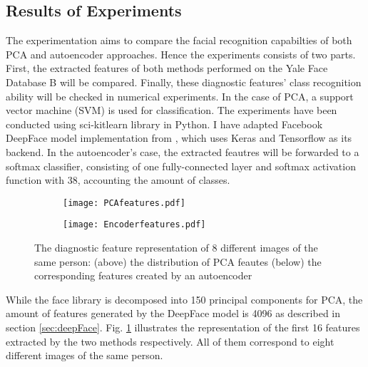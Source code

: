 \subsection{Results of Experiments}
The experimentation aims to compare the facial recognition capabilties of both
PCA and autoencoder approaches. Hence the experiments consists of two parts.
First, the extracted features of both methods performed on the Yale Face
Database B will be compared. Finally, these diagnostic features' class
recognition ability will be checked in numerical experiments. In the case of
PCA, a support vector machine (SVM) is used for classification. The experiments
have been conducted using sci-kitlearn \cite{sk} library in Python. I
have adapted Facebook DeepFace model implementation from
\cite{serengil2017tensorflow101}, which uses Keras \cite{chollet2015keras} and
Tensorflow \cite{tensorflow2015-whitepaper} as its backend. In the autoencoder's
case, the extracted feautres will be forwarded to a softmax classifier,
consisting of one fully-connected layer and softmax activation function with 38,
accounting the amount of classes.

\begin{figure}[h]
  \begin{subfigure}{}
    \texttt{[image: PCAfeatures.pdf]}
  \end{subfigure}

  \begin{subfigure}{}
    \texttt{[image: Encoderfeatures.pdf]}
  \end{subfigure}

  \caption{The diagnostic feature representation of 8 different images of the same person: (above) the distribution of PCA feautes (below) the corresponding features created by an autoencoder}
  \label{features}
\end{figure}

While the face library is decomposed into 150 principal components for PCA, the
amount of features generated by the DeepFace model is 4096 as described in
section \ref{sec:deepFace}. Fig. \ref{features} illustrates the representation
of the first 16 features extracted by the two methods respectively. All of them
correspond to eight different images of the same person. 

